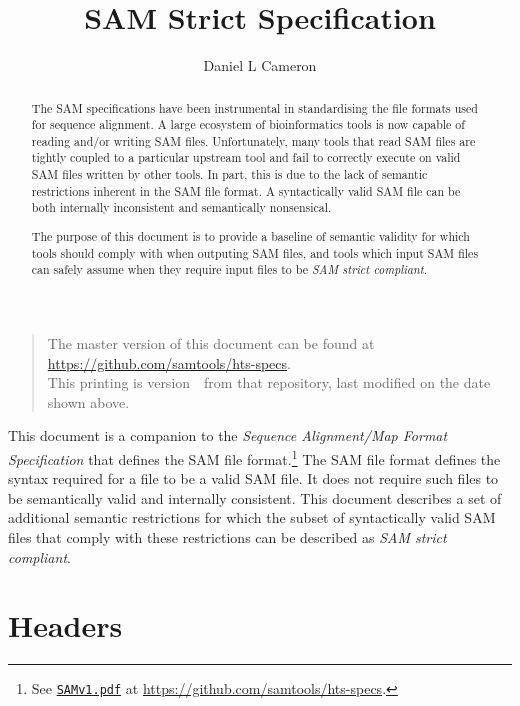 \documentclass[10pt]{article}
\begin{document}

\title{SAM Strict Specification}
\author{Daniel L Cameron}
\date{\headdate}
\maketitle
\begin{quote}\small
The master version of this document can be found at
\url{https://github.com/samtools/hts-specs}.\\
This printing is version~\commitdesc\ from that repository,
last modified on the date shown above.
\end{quote}
\vspace*{1em}

\noindent
This document is a companion to the {\sl Sequence Alignment/Map Format
Specification} that defines the SAM file format.\footnote{See
\href{http://samtools.github.io/hts-specs/SAMv1.pdf}{\tt SAMv1.pdf} at \url{https://github.com/samtools/hts-specs}.}
The SAM file format defines the syntax required for a file to be
a valid SAM file. It does not require such files to be semantically
valid and internally consistent.
This document describes a set of additional semantic restrictions
for which the subset of syntactically valid SAM files that comply
with these restrictions can be described as \textit{SAM strict
compliant}.

\renewcommand{\abstractname}{Introduction}
\begin{abstract}

The SAM specifications have been instrumental in standardising
the file formats used for sequence alignment. A large ecosystem of
bioinformatics tools is now capable of reading and/or writing
SAM files. Unfortunately, many tools that read SAM files are tightly
coupled to a particular upstream tool 
and fail to correctly execute on valid SAM files written by other
tools. In part, this is due to the lack of semantic restrictions
inherent in the SAM file format. A syntactically valid SAM file
can be both internally inconsistent and semantically nonsensical.

The purpose of this document is to provide a baseline of semantic
validity for which tools should comply with when outputing SAM
files, and tools which input SAM files can safely assume when
they require input files to be \textit{SAM strict compliant}.

\end{abstract}

\section{Headers}
\end{document}
